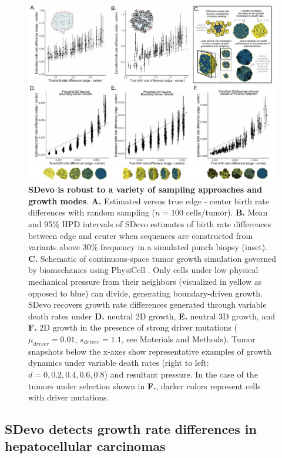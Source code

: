 \documentclass[12pt]{elife_based}
\begin{document}
\begin{figure}

     \includegraphics[width=\textwidth]{figures/fig4_ML_aff_ML2.pdf}
        \caption{\textbf{SDevo is robust to a variety of sampling approaches and growth modes}. 
        \textbf{A.} Estimated versus true edge - center birth rate differences with random sampling ($n = 100$ cells/tumor). \textbf{B.} Mean and 95\% HPD intervals of SDevo estimates of birth rate differences between edge and center when sequences are constructed from variants above 30\% frequency in a simulated punch biopsy (inset). \textbf{C.} Schematic of continuous-space tumor growth simulation governed by biomechanics using PhysiCell \citep{ghaffarizadeh2018physicell}. Only cells under low physical mechanical pressure from their neighbors (visualized in yellow as opposed to blue) can divide, generating boundary-driven growth. SDevo recovers growth rate differences generated through variable death rates under \textbf{D.} neutral 2D growth, \textbf{E.} neutral 3D growth, and \textbf{F.} 2D growth in the presence of strong driver mutations ($\mu_{driver} = 0.01$, $s_{driver} = 1.1$, see Materials and Methods). Tumor snapshots below the x-axes show representative examples of growth dynamics under variable death rates (right to left: $d = 0, 0.2, 0.4, 0.6, 0.8$) and resultant pressure. In the case of the tumors under selection shown in \textbf{F.}, darker colors represent cells with driver mutations.}

    \label{Fig4}
\end{figure} 


\subsection*{SDevo detects growth rate differences in hepatocellular carcinomas}
\end{document}
